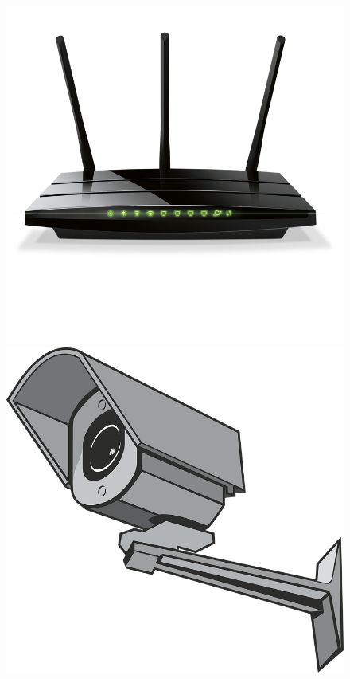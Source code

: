 \begin{frame}
\begin{columns}
\begin{figure}
      \includegraphics[scale=0.1]{images/router.png}
      \includegraphics[scale=0.05]{images/surveillance-camera.png}

\end{figure}
\end{columns}
\end{frame}
